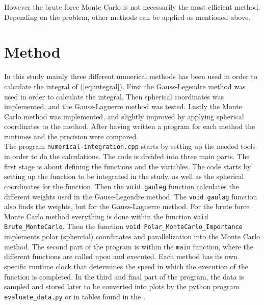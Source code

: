 \documentclass{article}
\begin{document}
However the brute force Monte Carlo is not necessarily the most efficient method. Depending on the problem, other methods can be applied as mentioned above.


\vspace{1cm}

\section{Method} \label{sec:Method}

In this study mainly three different numerical methods has been used in order to calculate the integral of (\ref{eq:integral}). First the Gauss-Legendre method was used in order to calculate the integral. Then spherical coordinates was implemented, and the Gauss-Laguerre method was tested. Lastly the Monte Carlo method was implemented, and slightly improved by applying spherical coordinates to the method. After having written a program for each method the runtimes and the precision were compared. \\

The program \texttt{numerical-integration.cpp} starts by setting up the needed tools in order to do the calculations. The code is divided into three main parts. The first stage is about defining the functions and the variables. The code starts by setting up the function to be integrated in the study, as well as the spherical coordinates for the function. Then the \texttt{void gauleg} function calculates the different weights used in the Gauss-Legendre method. The \texttt{void gaulag} function also finds the weights, but for the Gauss-Laguerre method. For the brute force Monte Carlo method everything is done within the function \texttt{void Brute\_MonteCarlo}. Then the function \texttt{void Polar\_MonteCarlo\_Importance} implements polar (sphercial) coordinates and parallelization into the Monte Carlo method. The second part of the program is within the \texttt{main} function, where the different functions are called upon and executed. Each method has its own specific runtime clock that determines the speed in which the execution of the function is completed. In the third and final part of the program, the data is sampled and stored later to be converted into plots by the python program \texttt{evaluate\_data.py} or in tables found in the . \\


\vspace{1cm}
\end{document}
